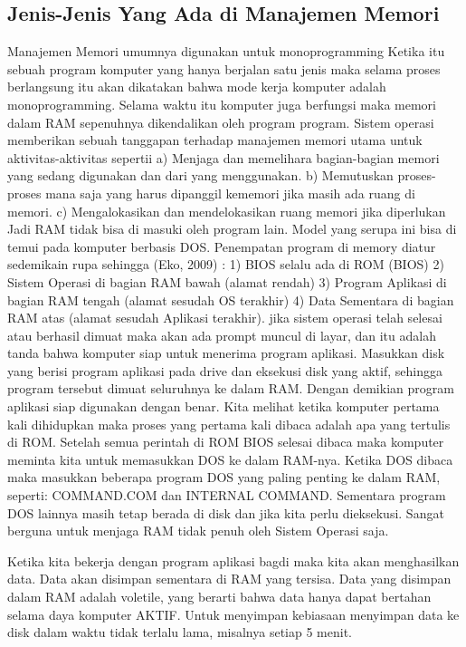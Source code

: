 \subsection {Jenis-Jenis Yang Ada di Manajemen Memori}
Manajemen Memori umumnya digunakan untuk monoprogramming
Ketika itu sebuah program komputer yang hanya berjalan satu jenis maka selama proses berlangsung itu akan dikatakan bahwa mode kerja komputer adalah monoprogramming. Selama waktu itu komputer juga berfungsi maka memori dalam RAM sepenuhnya dikendalikan oleh program program.
Sistem operasi memberikan sebuah  tanggapan terhadap manajemen memori utama untuk aktivitas-aktivitas sepertii 
a)      Menjaga dan memelihara bagian-bagian memori yang sedang digunakan dan dari yang menggunakan.
b)      Memutuskan proses-proses mana saja yang harus dipanggil kememori jika masih ada ruang di memori.
c)      Mengalokasikan dan mendelokasikan ruang memori jika diperlukan
Jadi  RAM tidak bisa di masuki oleh program lain. Model yang  serupa ini bisa di temui pada komputer berbasis DOS.
Penempatan program di memory  diatur sedemikain rupa sehingga (Eko, 2009) :
1)      BIOS selalu ada di ROM (BIOS)
2)      Sistem Operasi  di bagian RAM bawah (alamat rendah)
3)      Program Aplikasi di bagian RAM tengah (alamat sesudah OS terakhir)
4)     Data Sementara di bagian RAM atas (alamat sesudah Aplikasi terakhir).
jika sistem operasi telah selesai atau berhasil dimuat maka akan ada prompt muncul di layar, dan itu adalah tanda bahwa komputer siap untuk menerima program aplikasi. Masukkan disk yang berisi program aplikasi pada drive dan eksekusi disk yang aktif, sehingga program tersebut dimuat seluruhnya ke dalam RAM. Dengan demikian program aplikasi siap digunakan dengan benar. Kita melihat ketika komputer pertama kali dihidupkan maka proses yang pertama kali dibaca adalah apa yang tertulis di ROM. Setelah semua perintah di ROM BIOS selesai dibaca maka komputer meminta kita untuk memasukkan DOS ke dalam RAM-nya. Ketika DOS dibaca maka masukkan beberapa program DOS yang paling penting ke dalam RAM, seperti: COMMAND.COM dan INTERNAL COMMAND. Sementara program DOS lainnya masih tetap berada di disk dan jika kita perlu dieksekusi. Sangat berguna untuk menjaga RAM tidak penuh oleh Sistem Operasi saja.

Ketika kita bekerja dengan program aplikasi bagdi maka kita akan menghasilkan data. Data akan disimpan sementara di RAM yang tersisa. Data yang disimpan dalam RAM adalah voletile, yang berarti bahwa data hanya dapat bertahan selama daya komputer AKTIF. Untuk menyimpan kebiasaan menyimpan data ke disk dalam waktu tidak terlalu lama, misalnya setiap 5 menit.

